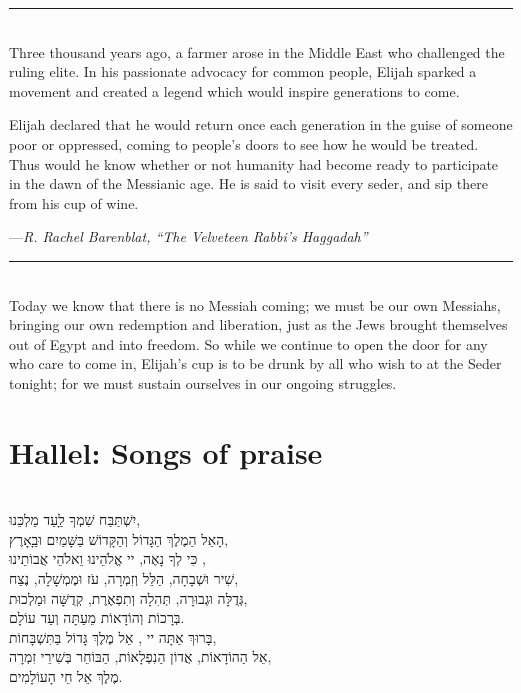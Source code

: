 \documentclass[a4paper,12pt,openany]{memoir}
\newcommand{\HgInst}[1]{{\noindent\sffamily{\bfseries{#1}}}}
\newcommand{\HgSource}[1]{\hfill{\small---\itshape{#1}}}
\newcommand{\HgFill}{\vfill \hrule \vfill}
\newenvironment{HgEnglish}{\strut\\\noindent}{\vspace{1em}}
\newenvironment{HgHebrew}{\begin{hebrew}\strut\\\noindent\Large}{\end{hebrew}}
\newcommand{\SSrc}{\textsuperscript{\upshape{[S]}}}
\begin{document}
\HgFill

\begin{HgEnglish}
Three thousand years ago, a farmer arose in the Middle East who challenged the
ruling elite. In his passionate advocacy for common people, Elijah sparked a
movement and created a legend which would inspire generations to come.

Elijah declared that he would return once each generation in the guise of
someone poor or oppressed, coming to people's doors to see how he would be
treated. Thus would he know whether or not humanity had become ready to
participate in the dawn of the Messianic age. He is said to visit every seder,
and sip there from his cup of wine.

\HgSource{R. Rachel Barenblat, ``The Velveteen Rabbi's Haggadah''}
\end{HgEnglish}


\HgFill

\begin{HgEnglish}
  Today we know that there is no Messiah coming; we must be our own Messiahs,
  bringing our own redemption and liberation, just as the Jews brought
  themselves out of Egypt and into freedom. So while we continue to open the
  door for any who care to come in, Elijah’s cup is to be drunk by all who wish
  to at the Seder tonight; for we must sustain ourselves in our ongoing
  struggles. \SSrc
\end{HgEnglish}


\chapter*{Hallel: Songs of praise}

\HgInst{Read from the facing page. Then recite:}

\begin{HgHebrew}
  יִשְׁתַּבַּח שִׁמְךָ לַָעַד מַלְכֵּנוּ,  \\
  הָאֵל הַמֶלֶךְ הַגָּדוֹל וְהַקָּדוֹשׁ בַּשָּׁמַיִם וּבַָאָרֶץ, \\
  כִּי לְךָ נָאֶה, יי אֱלֹהֵינוּ וֵאלֹהֵי אֲבוֹתֵינוּ ,  \\
  שִׁיר וּשְׁבָחָה, הַלֵּל וְזִמְרָה, עֹז וּמֶמְשָׁלָה, נֶצַח,  \\
  גְּדֻלָּה וּגְבוּרָה, תְּהִלָה וְתִפְאֶרֶת, קְדֻשָּׁה וּמַלְכוּת, \\
  בְּרָכוֹת וְהוֹדָאוֹת מֵעַתָּה וְעַד עוֹלָם.  \\
  בָּרוּךְ אַתָּה יי , אֵל מֶלֶךְ גָּדוֹל בַּתִּשְׁבָּחוֹת,  \\
  אֵל הַהוֹדָאוֹת, אֲדוֹן הַנִפְלָאוֹת, הַבּוֹחֵר בְּשִׁירֵי זִמְרָה,  \\
  מֶלֶךְ אֵל חֵי הָעוֹלָמִים. 
\end{HgHebrew}
\end{document}
